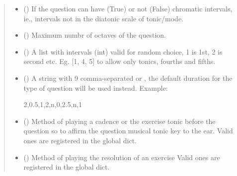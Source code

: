 \documentclass[letterpaper,10pt,english]{sphinxmanual}
\begin{document}
\begin{fulllineitems}
\begin{fulllineitems}
\begin{quote}
\begin{description}
\begin{itemize}
\item {} 
 () \textendash{} If the question can have (True) or not
(False) chromatic intervals, ie., intervals not in the
diatonic scale of tonic/mode.

\item {} 
 () \textendash{} Maximum numbr of octaves of the question.

\item {} 
 () \textendash{} A list with intervals (int) valid for
random choice, 1 is 1st, 2 is second etc. Eg. {[}1, 4, 5{]} to
allow only tonics, fourths and fifths.

\item {} 
 () \textendash{} 
A string with 9 comma-separated  or
, the
default duration for the type of question will be used instead.
Example:

\begin{sphinxVerbatim}[commandchars=\\\{\}]
\PYGZdq{}2,0.5,1,2,n,0,2.5,n,1\PYGZdq{}
\end{sphinxVerbatim}


\item {} 
 () \textendash{} Method of playing a cadence or the
exercise tonic before the question so to affirm the question
musical tonic key to the ear. Valid ones are registered in the
 global dict.

\item {} 
 () \textendash{} Method of playing the resolution of an
exercise Valid ones are registered in the
 global dict.


\end{itemize}
\end{description}
\end{quote}
\end{fulllineitems}
\end{fulllineitems}
\end{document}
